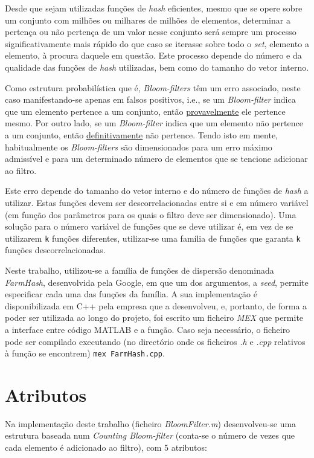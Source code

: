 \documentclass[a4paper,11pt,openright,oneside]{report}
\begin{document}
Desde que sejam utilizadas funções de \textit{hash} eficientes, mesmo que se opere sobre um conjunto com milhões ou milhares de milhões de elementos, determinar a pertença ou não pertença de um valor nesse conjunto será sempre um processo significativamente mais rápido do que caso se iterasse sobre todo o \textit{set}, elemento a elemento, à procura daquele em questão. Este processo depende do número e da qualidade das funções de \textit{hash} utilizadas, bem como do tamanho do vetor interno.

Como estrutura probabilística que é, \textit{Bloom-filters} têm um erro associado, neste caso manifestando-se apenas em falsos positivos, i.e., se um \textit{Bloom-filter} indica que um elemento pertence a um conjunto, então \underline{provavelmente} ele pertence mesmo. Por outro lado, se um \textit{Bloom-filter} indica que um elemento não pertence a um conjunto, então \underline{definitivamente} não pertence. Tendo isto em mente, habitualmente os \textit{Bloom-filters} são dimensionados para um erro máximo admissível e para um determinado número de elementos que se tencione adicionar ao filtro.

Este erro depende do tamanho do vetor interno e do número de funções de \textit{hash} a utilizar. Estas funções devem ser descorrelacionadas entre si e em número variável (em função dos parâmetros para os quais o filtro deve ser dimensionado). Uma solução para o número variável de funções que se deve utilizar é, em vez de se utilizarem \texttt{k} funções diferentes, utilizar-se uma família de funções que garanta \texttt{k} funções descorrelacionadas.

Neste trabalho, utilizou-se a família de funções de dispersão denominada \textit{FarmHash}, desenvolvida pela Google, em que um dos argumentos, a \textit{seed}, permite especificar cada uma das funções da família. A sua implementação é disponibilizada em C++ pela empresa que a desenvolveu, e, portanto, de forma a poder ser utilizada ao longo do projeto, foi escrito um ficheiro \textit{MEX} que permite a interface entre código MATLAB e a função. Caso seja necessário, o ficheiro pode ser compilado executando (no directório onde os ficheiros \textit{.h} e \textit{.cpp} relativos à função se encontrem) \verb|mex FarmHash.cpp|.

\section{Atributos}
\label{sec.attributes}

Na implementação deste trabalho (ficheiro \textit{BloomFilter.m}) desenvolveu-se uma estrutura baseada num \textit{Counting Bloom-filter} (conta-se o número de vezes que cada elemento é adicionado ao filtro), com 5 atributos:
\end{document}
